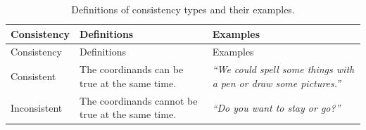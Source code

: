 \documentclass[floatsintext,man]{apa6}
\theoremstyle{definition}
\theoremstyle{definition}
\theoremstyle{definition}
\theoremstyle{remark}
\begin{document}
\begin{longtable}[]{@{}lll@{}}
\caption{\label{tab:consistencyType} Definitions of consistency types and
their examples.}\tabularnewline
\toprule
\begin{minipage}[b]{0.14\columnwidth}\raggedright\strut
Consistency\strut
\end{minipage} & \begin{minipage}[b]{0.25\columnwidth}\raggedright\strut
Definitions\strut
\end{minipage} & \begin{minipage}[b]{0.42\columnwidth}\raggedright\strut
Examples\strut
\end{minipage}\tabularnewline
\midrule
\endfirsthead
\toprule
\begin{minipage}[b]{0.14\columnwidth}\raggedright\strut
Consistency\strut
\end{minipage} & \begin{minipage}[b]{0.25\columnwidth}\raggedright\strut
Definitions\strut
\end{minipage} & \begin{minipage}[b]{0.42\columnwidth}\raggedright\strut
Examples\strut
\end{minipage}\tabularnewline
\midrule
\endhead
\begin{minipage}[t]{0.14\columnwidth}\raggedright\strut
Consistent\strut
\end{minipage} & \begin{minipage}[t]{0.25\columnwidth}\raggedright\strut
The coordinands can be true at the same time.\strut
\end{minipage} & \begin{minipage}[t]{0.42\columnwidth}\raggedright\strut
\emph{\enquote{We could spell some things with a pen or draw some
pictures.}}\strut
\end{minipage}\tabularnewline
\begin{minipage}[t]{0.14\columnwidth}\raggedright\strut
Inconsistent\strut
\end{minipage} & \begin{minipage}[t]{0.25\columnwidth}\raggedright\strut
The coordinands cannot be true at the same time.\strut
\end{minipage} & \begin{minipage}[t]{0.42\columnwidth}\raggedright\strut
\emph{\enquote{Do you want to stay or go?}}\strut
\end{minipage}\tabularnewline
\bottomrule
\end{longtable}
\end{document}
